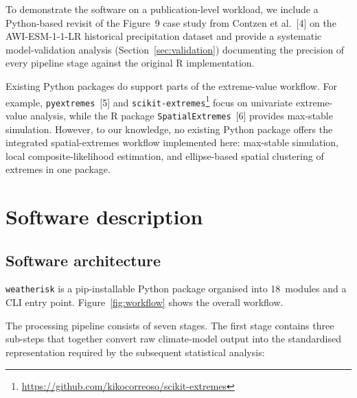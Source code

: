 \documentclass[preprint,12pt,a4paper]{elsarticle}
\newcommand{\rev}[1]{{#1}}
\newcommand{\revb}[1]{{#1}}
\begin{document}
\rev{To demonstrate the software on a publication-level workload, we
include a \revb{Python-based revisit of the Figure~9 case study} from Contzen et al.~[4] on the
AWI-ESM-1-1-LR historical precipitation dataset and provide a
systematic model-validation analysis (Section~\ref{sec:validation})
documenting the precision of every pipeline stage against the original
R implementation.}

Existing Python packages do support parts of the extreme-value workflow.
For example, \texttt{pyextremes}~[5] and
\texttt{scikit-extremes}\footnote{\url{https://github.com/kikocorreoso/scikit-extremes}}
focus on univariate extreme-value analysis, while the R package
\texttt{SpatialExtremes}~[6] provides max-stable simulation.
However, to our knowledge, no existing Python package offers the
integrated spatial-extremes workflow implemented here: max-stable
simulation, local composite-likelihood estimation, and ellipse-based
spatial clustering of extremes in one package.

\section{Software description}
\label{sec:description}

\subsection{Software architecture}
\label{sec:architecture}

\texttt{weatherisk} is a pip-installable Python package organised
into 18~modules and a CLI entry point.  Figure~\ref{fig:workflow}
shows the overall workflow.

\rev{The processing pipeline consists of seven stages. The first
stage contains three sub-steps that together convert raw climate-model
output into the standardised representation required by the
subsequent statistical analysis:}
\end{document}
